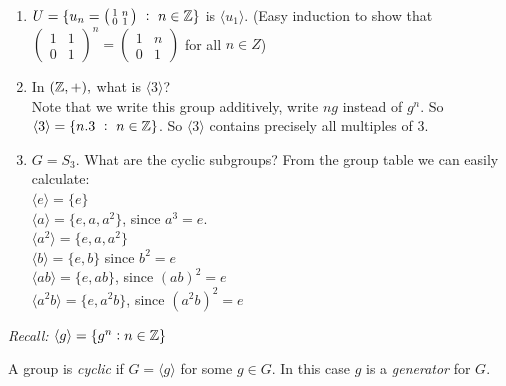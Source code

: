\begin{examples} \begin{enumerate}
 \item $U = \{u_n = \left(\begin{smallmatrix}
1 & n \\ 0 & 1	
\end{smallmatrix}\right) ~:~ n \in \mathbb{Z}
\}$	is $\langle u_1 \rangle $. (Easy induction to show that $\left(\begin{smallmatrix}
1 & 1 \\ 0 & 1	
\end{smallmatrix}\right)^n = \left(\begin{smallmatrix}
1 & n \\ 0 & 1	
\end{smallmatrix}\right)$ for all $n \in Z$)
\item In $(\mathbb{Z},+),$ what is $\langle 3 \rangle $?\\
Note that we write this group additively, write $ng$ instead of $g^n$. So $\langle 3 \rangle = \{n.3 ~:~ n \in \mathbb{Z}\}$. So $\langle 3 \rangle$ contains precisely all multiples of 3.
\item $G = S_3$. What are the cyclic subgroups? From the group table we can easily calculate:\\\vspace{5pt}
$\langle e \rangle = \{e\}$\\ \vspace{5pt}
$\langle a \rangle = \{e,a,a^2\}$, since $a^3 = e$.\\\vspace{5pt}
$\langle a^2 \rangle = \{e,a,a^2\}$\\\vspace{5pt}
$\langle b\rangle = \{e,b\}$ since $b^2 = e$\\\vspace{5pt}
$\langle ab \rangle = \{e,ab\}$, since $(ab)^2 = e$\\\vspace{5pt}
$\langle a^2b \rangle = \{e,a^2b\}$, since $(a^2b)^2 = e$\\
 \end{enumerate}
 \end{examples}\vspace*{10pt}
 
\textit{Recall:}   
$\langle g \rangle = \{g^n : n \in \mathbb{Z}\}$\\

\begin{definition} A group is \emph{cyclic} if $G = \langle g \rangle $ for some $g \in G$. In this case $g$ is a \emph{generator} for $G$.
	
\end{definition}\vspace*{10pt}

